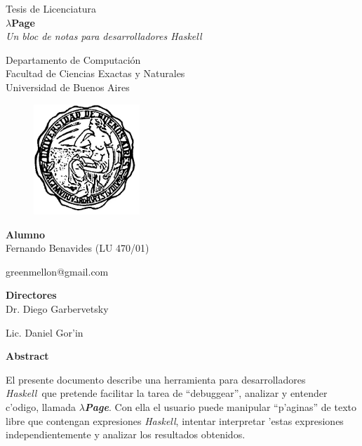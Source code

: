 \documentclass[a4paper]{article}
\newcommand{\haskell}{\textsl{Haskell}}
\newcommand{\hpage}{\textbf{\textsl{$\lambda$Page}}}
\begin{document}
    \thispagestyle{empty}
    \begin{center}
	    {\Large Tesis de Licenciatura}\\[1em]
	    {\huge \textbf{$\lambda$Page}}\\[0.5em]
	    {\large \textit{Un bloc de notas para desarrolladores Haskell}}\\[1em]
	    \par{}
	    {\large Departamento de Computaci\'on}\\[0.5em]
	    {\large Facultad de Ciencias Exactas y Naturales}\\[0.5em]
	    {\large Universidad de Buenos Aires}
	    \par{}
	    \begin{figure}[h]
	        \begin{center}
	        \includegraphics[width=40mm]{pictures/logoUba}
	        \end{center}
	    \end{figure}
	    {\Large \textbf{Alumno}}\\[0.8em]
	    {\Large Fernando Benavides (LU 470/01)} \par
	    {\Large greenmellon@gmail.com} \par
	    \par{}
	    {\Large \textbf{Directores}}\\[0.8em]
	    {\Large Dr. Diego Garbervetsky} \par
	    {\Large Lic. Daniel Gor'in} \par
	    \par{}
         {\Large \textbf{Abstract}}\\[0.5em]
    \end{center}
    El presente documento describe una herramienta para desarrolladores \haskell\ que pretende facilitar la tarea de ``debuggear'', analizar y entender c'odigo, llamada \hpage.  Con ella el usuario puede manipular ``p'aginas'' de texto libre que contengan expresiones \haskell, intentar interpretar 'estas expresiones independientemente y analizar los resultados obtenidos.
    \newpage
\end{document}
